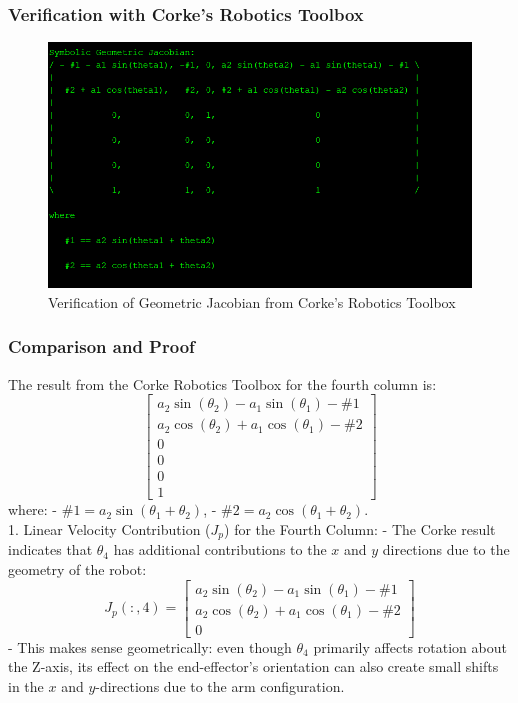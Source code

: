 \documentclass[12pt]{report}
\begin{document}
\subsubsection{Verification with Corke's Robotics Toolbox}
\begin{figure}[H]
	\centering
	\includegraphics[scale=1]{run9} %
	\caption{Verification of Geometric Jacobian from Corke's Robotics Toolbox}
	\label{run9} %
\end{figure}





\subsubsection{Comparison and Proof}
The result from the Corke Robotics Toolbox for the fourth column is:
\[
\begin{bmatrix}
	a_2 \sin(\theta_2) - a_1 \sin(\theta_1) - \#1 \\
	a_2 \cos(\theta_2) + a_1 \cos(\theta_1) - \#2 \\
	0 \\
	0 \\
	0 \\
	1
\end{bmatrix}
\]
where:
- \(\#1 = a_2 \sin(\theta_1 + \theta_2)\),
- \(\#2 = a_2 \cos(\theta_1 + \theta_2)\).
\\1. Linear Velocity Contribution (\(J_p\)) for the Fourth Column:
- The Corke result indicates that \(\theta_4\) has additional contributions to the \(x\) and \(y\) directions due to the geometry of the robot:
\[
J_p(:,4) =
\begin{bmatrix}
	a_2 \sin(\theta_2) - a_1 \sin(\theta_1) - \#1 \\
	a_2 \cos(\theta_2) + a_1 \cos(\theta_1) - \#2 \\
	0
\end{bmatrix}
\]
- This makes sense geometrically: even though \(\theta_4\) primarily affects rotation about the Z-axis, its effect on the end-effector's orientation can also create small shifts in the \(x\) and \(y\)-directions due to the arm configuration.
\end{document}
